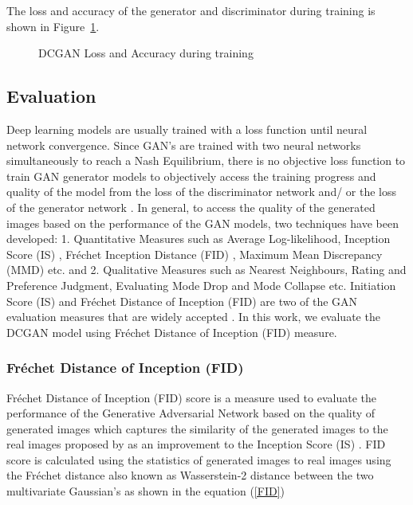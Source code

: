 \documentclass{article}
\begin{document}
The loss and accuracy of the generator and discriminator during training is shown in Figure~\ref{fig:DCGANlossacc}.

\begin{figure}[htbp]
    \centering
    \qquad
    \caption{DCGAN Loss and Accuracy during training}\label{fig:DCGANlossacc}\end{figure}

\subsection*{Evaluation}

Deep learning models are usually trained with a loss function until neural network convergence. Since GAN's are trained with two neural networks simultaneously to reach a Nash Equilibrium, there is no objective loss function to train GAN generator models to objectively access the training progress and quality of the model from the loss of the discriminator network and/ or the loss of the generator network \cite{salimans2016improved}. In general, to access the quality of the generated images based on the performance of the GAN models, two techniques have been developed: 1. Quantitative Measures such as Average Log-likelihood, Inception Score (IS) \cite{salimans2016improved}, Fréchet Inception Distance (FID) \cite{heusel2017gans}, Maximum Mean Discrepancy (MMD) \cite{ASENS_1953_3_70_3_267_0} etc. and 2. Qualitative Measures such as Nearest Neighbours, Rating and Preference Judgment, Evaluating Mode Drop and Mode Collapse \cite{srivastava2017veegan} etc. Initiation Score (IS) and Fréchet Distance of Inception (FID) are two of the GAN evaluation measures that are widely accepted \cite{borji2018pros}. In this work, we evaluate the DCGAN model using Fréchet Distance of Inception (FID) measure.

\subsubsection*{Fréchet Distance of Inception (FID)}

Fréchet Distance of Inception (FID) score is a measure used to evaluate the performance of the Generative Adversarial Network based on the quality of generated images which captures the similarity of the generated images to the real images proposed by \cite{heusel2017gans} as an improvement to the Inception Score (IS) \cite{salimans2016improved}. FID score is calculated using the statistics of generated images to real images using the Fréchet distance also known as Wasserstein-2 distance between the two multivariate Gaussian's as shown in the equation (\ref{FID})
\end{document}

